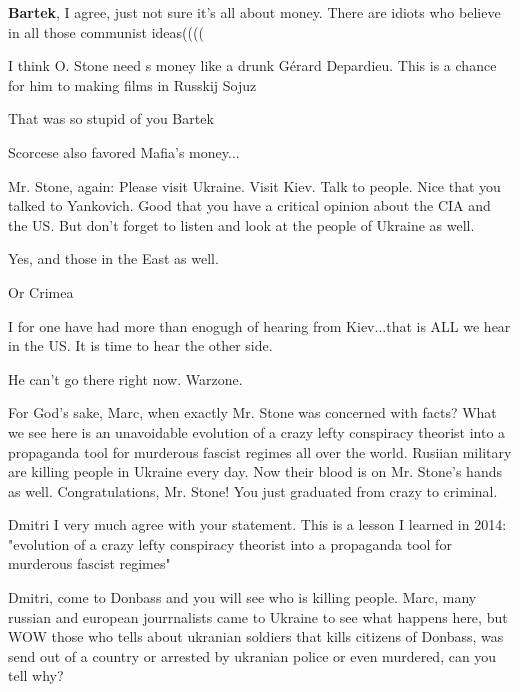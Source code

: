 \begin{itemize}
\begin{itemize}
\textbf{Bartek}, I agree, just not sure it's all about money. There are idiots who believe in all those communist ideas((((

I think O. Stone need s money like a drunk Gérard Depardieu. This is a chance for him to making films in Russkij Sojuz

That was so stupid of you Bartek

Scorcese also favored Mafia's money...
\end{itemize} %


Mr. Stone, again: Please visit Ukraine. Visit Kiev. Talk to people. Nice that
you talked to Yankovich. Good that you have a critical opinion about the CIA
and the US. But don't forget to listen and look at the people of Ukraine as
well.

\begin{itemize} %
Yes, and those in the East as well.

Or Crimea

I for one have had more than enogugh of hearing from Kiev...that is ALL we hear in the US. It is time to hear the other side.

He can't go there right now. Warzone.


For God's sake, Marc, when exactly Mr. Stone was concerned with facts? What we
see here is an unavoidable evolution of a crazy lefty conspiracy theorist into
a propaganda tool for murderous fascist regimes all over the world. Rusiian
military are killing people in Ukraine every day. Now their blood is on Mr.
Stone's hands as well. Congratulations, Mr. Stone! You just graduated from
crazy to criminal.


Dmitri I very much agree with your statement. This is a lesson I learned in
2014: "evolution of a crazy lefty conspiracy theorist into a propaganda tool for
murderous fascist regimes"


Dmitri, come to Donbass and you will see who is killing people. Marc, many
russian and european jourrnalists came to Ukraine to see what happens here, but
WOW those who tells about ukranian soldiers that kills citizens of Donbass, was
send out of a country or arrested by ukranian police or even murdered, can you
tell why?



\end{itemize}
\end{itemize}
